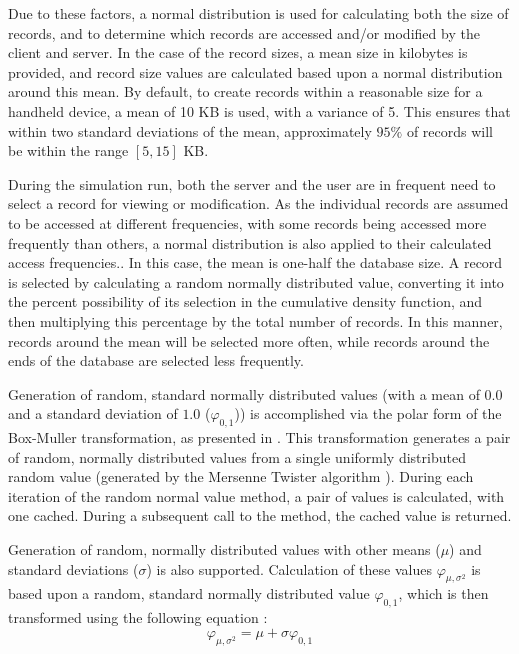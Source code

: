 Due to these factors, a normal distribution is used for calculating both the size of records, and to determine which records are accessed and/or modified by the client and server.  In the case of the record sizes, a mean size in kilobytes is provided, and record size values are calculated based upon a normal distribution around this mean.  By default, to create records within a reasonable size for a handheld device, a mean of 10 KB is used, with a variance of 5.  This ensures that within two standard deviations of the mean, approximately $95\%$ of records will be within the range $[5, 15]$ KB.

During the simulation run, both the server and the user are in frequent need to select a record for viewing or modification.  As the individual records are assumed to be accessed at different frequencies, with some records being accessed more frequently than others, a normal distribution is also applied to their calculated access frequencies..  In this case, the mean is one-half the database size.  A record is selected by calculating a random normally distributed value, converting it into the percent possibility of its selection in the cumulative density function, and then multiplying this percentage by the total number of records.  In this manner, records around the mean will be selected more often, while records around the ends of the database are selected less frequently.

Generation of random, standard normally distributed values (with a mean of $0.0$ and a standard deviation of $1.0$ ($\varphi_{0, 1}$)) is accomplished via the polar form of the Box-Muller transformation, as presented in \cite{RefWorks:42}.  This transformation generates a pair of random, normally distributed values from a single uniformly distributed random value (generated by the Mersenne Twister algorithm \cite{RefWorks:43, mersennetwistcode}).  During each iteration of the random normal value method, a pair of values is calculated, with one cached.  During a subsequent call to the method, the cached value is returned.

Generation of random, normally distributed values with other means ($\mu$) and standard deviations ($\sigma$) is also supported.  Calculation of these values $\varphi_{\mu,\sigma^2}$ is based upon a random, standard normally distributed value $\varphi_{0, 1}$, which is then transformed using the following equation \cite{RefWorks:38}:
\begin{equation}
\varphi_{\mu,\sigma^2} = \mu + \sigma \varphi_{0,1}\label{normal_dist}
\end{equation}

